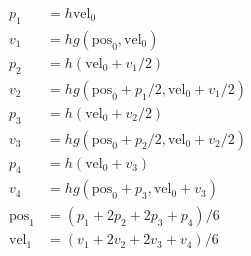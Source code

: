 \begin{equation}
\label{method}
\begin{split}
    p_1 & = h\text{vel}_0 \\
    v_1 & = hg(\text{pos}_0, \text{vel}_0) \\
    p_2 & = h(\text{vel}_0+v_1/2) \\
    v_2 & = hg(\text{pos}_0+p_1/2, \text{vel}_0+v_1/2) \\
    p_3 & = h(\text{vel}_0+v_2/2) \\
    v_3 & = hg(\text{pos}_0+p_2/2, \text{vel}_0+v_2/2) \\
    p_4 & = h(\text{vel}_0+v_3) \\
    v_4 & = hg(\text{pos}_0+p_3, \text{vel}_0+v_3) \\
    \text{pos}_1 & = (p_1+2p_2+2p_3+p_4)/6 \\
    \text{vel}_1 & = (v_1+2v_2+2v_3+v_4)/6
\end{split}
\end{equation}